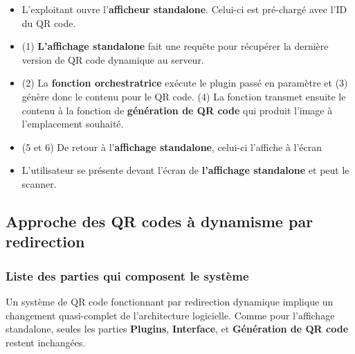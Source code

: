 \documentclass[a4paper,12pt]{article}
\begin{document}
\begin{itemize}
  
  \item L'exploitant ouvre l'\textbf{afficheur standalone}. Celui-ci est pré-chargé avec l'ID du QR code.
  \item (1) \textbf{L'affichage standalone} fait une requête pour récupérer la dernière version de QR code dynamique au serveur.
  \item (2) La \textbf{fonction orchestratrice} exécute le plugin passé en paramètre et (3) génère donc le contenu pour le QR code. (4) La fonction transmet ensuite le contenu à la fonction de \textbf{génération de QR code} qui produit l'image à l'emplacement souhaité.
  \item (5 et 6) De retour à l'\textbf{affichage standalone}, celui-ci l'affiche à l'écran
  \item L'utilisateur se présente devant l'écran de \textbf{l'affichage standalone} et peut le scanner.\\
  
\end{itemize}


\subsection{Approche des QR codes à dynamisme par redirection}

\subsubsection{Liste des parties qui composent le système}

Un système de QR code fonctionnant par redirection dynamique implique un changement quasi-complet de l'architecture logicielle. Comme pour l'affichage standalone, seules les parties \textbf{Plugins}, \textbf{Interface}, et \textbf{Génération de QR code} restent inchangées.\\
\end{document}
